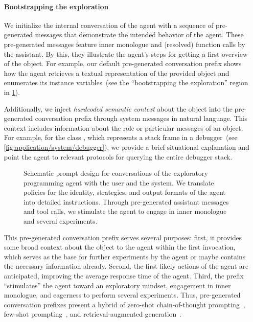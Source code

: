 \paragraph*{Bootstrapping the exploration}
We initialize the internal conversation of the agent with a sequence of pre-generated messages that demonstrate the intended behavior of the agent.
These pre-generated messages feature inner monologue and (resolved) function calls by the assistant.
By this, they illustrate the agent's steps for getting a first overview of the object.
For example, our default pre-generated conversation prefix shows how the agent retrieves a textual representation of the provided object and enumerates its instance variables~(see the ``bootstrapping the exploration'' region in \cref{fig:agent/prompts/design}).

Additionally, we inject \emph{hardcoded semantic context} about the object into the pre-generated conversation prefix through system messages in natural language.
This context includes information about the role or particular messages of an object.
For example, for the class , which represents a stack frame in a debugger~(see \cref{fig:application/system/debugger}), we provide a brief situational explanation and point the agent to relevant protocols for querying the entire debugger stack.

\begin{figure}
	\centering
	\begin{threeparttable}
		\centering
		{\footnotesize
		}
	\end{threeparttable}
	\caption[Schematic prompt design for conversations of the exploratory programming agent with the user and the system.]{
		Schematic prompt design for conversations of the exploratory programming agent with the user and the system.
		We translate policies for the identity, strategies, and output formats of the agent into detailed instructions.
		Through pre-generated assistant messages and tool calls, we stimulate the agent to engage in inner monologue and several experiments.
	}
	\label{fig:agent/prompts/design}
\end{figure}

This pre-generated conversation prefix serves several purposes:
first, it provides some broad context about the object to the agent within the first invocation, which serves as the base for further experiments by the agent or maybe contains the necessary information already.
Second, the first likely actions of the agent are anticipated, improving the average response time of the agent.
Third, the prefix ``stimulates'' the agent toward an exploratory mindset, engagement in inner monologue, and eagerness to perform several experiments.
Thus, pre-generated conversation prefixes present a hybrid of zero-shot chain-of-thought prompting~\cite{kojima2022large}, few-shot prompting~\cite{brown2020language}, and retrieval-augmented generation~\cite{lewis2020retrieval}.
